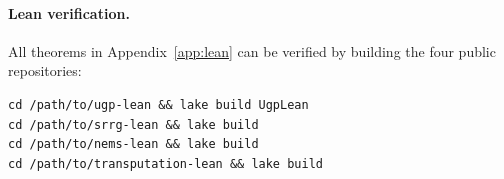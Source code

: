 \documentclass[11pt]{article}
\theoremstyle{remark}
\begin{document}
\paragraph{Lean verification.}
All theorems in Appendix~\ref{app:lean} can be verified by building the
four public repositories:
\begin{verbatim}
cd /path/to/ugp-lean && lake build UgpLean
cd /path/to/srrg-lean && lake build
cd /path/to/nems-lean && lake build
cd /path/to/transputation-lean && lake build
\end{verbatim}



\end{document}
